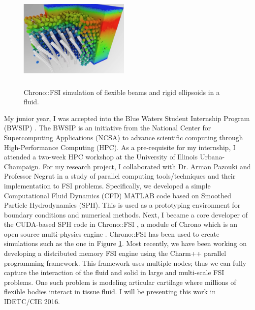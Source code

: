 \documentclass{article}
\theoremstyle{definition}
\begin{document}
\begin{figure}
    \vspace{-23pt}

  \begin{center}
    \includegraphics[width=0.48\textwidth, height=5cm]{fsi.png}
  \end{center}
    \vspace{-15pt}

  \caption{Chrono::FSI simulation of flexible beams and rigid ellipsoids in a fluid.}\label{Fig:fsi}
  \vspace{-10pt}
\end{figure}


My junior year, I was accepted into the Blue Waters Student Internship Program (BWSIP) \cite{bwsip}. The BWSIP is an initiative from the National Center for Supercomputing Applications (NCSA) to advance scientific computing through High-Performance Computing (HPC). As a pre-requisite for my internship, I attended a two-week HPC workshop at the University of Illinois Urbana-Champaign. For my research project, I collaborated with Dr. Arman Pazouki and Professor Negrut in a study of parallel computing tools/techniques and their implementation to FSI problems. Specifically, we developed a simple Computational Fluid Dynamics (CFD) MATLAB code based on Smoothed Particle Hydrodynamics (SPH). This is used as a prototyping environment for boundary conditions and numerical methods. Next, I became a core developer of the CUDA-based SPH code in Chrono::FSI \cite{chronoFSI}, a module of Chrono which is an open source multi-physics engine \cite{chrono}. Chrono::FSI has been used to create simulations such as the one in Figure \ref{Fig:fsi}. Most recently, we have been working on developing a distributed memory FSI engine using the Charm++ parallel programming framework. This framework uses multiple nodes; thus we can fully capture the interaction of the fluid and solid in large and multi-scale FSI problems. One such problem is modeling articular cartilage where millions of flexible bodies interact in tissue fluid. I will be presenting this work in IDETC/CIE 2016.
\end{document}
